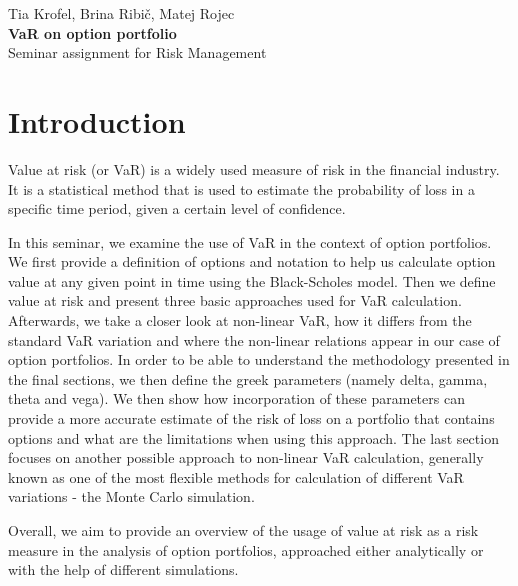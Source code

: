 \documentclass[a4paper, 12pt]{article}
\theoremstyle{definition}
\theoremstyle{plain}
\theoremstyle{definition}
\newcommand{\imeavtorja}{Tia Krofel, Brina Ribič, Matej Rojec}
\newcommand{\naslovdela}{VaR on option portfolio}
\newcommand{\letnica}{2022}
\begin{document}
\thispagestyle{empty}
\noindent{\large
University of Ljubljana\\[1mm]
School of Economics and Business\\[5mm]
}
\vfill

\begin{center}{\large
\imeavtorja\\[2mm]
{\bf \naslovdela}\\[10mm]
Seminar assignment for Risk Management\\[1cm]}
\end{center}
\vfill

\noindent{\large
Ljubljana, \letnica}
\pagebreak

\thispagestyle{empty}
\tableofcontents
\listoffigures
\pagebreak

\section{Introduction}

Value at risk (or VaR) is a widely used measure of risk 
in the financial industry.
It is a statistical method that is used to estimate the probability 
of loss in a specific time period, given a certain level of confidence.

In this seminar, we examine the use of VaR in the context of 
option portfolios. We first provide a definition of options and 
notation to help us calculate option value at any given point in time
using the Black-Scholes model. Then we define value at risk and present 
three basic approaches used for VaR calculation. 
Afterwards, we take a closer look at non-linear VaR, how it differs from 
the standard VaR variation and where the non-linear relations appear in 
our case of option portfolios. In order to be able to understand the methodology 
presented in the final sections, we then define the greek parameters (namely 
delta, gamma, theta and vega).
We then show how incorporation of these parameters can provide a more accurate 
estimate of the risk of loss on a portfolio that contains options and 
what are the limitations when using this approach. 
The last section focuses on another possible approach to non-linear VaR calculation, 
generally known as one of the most flexible methods for calculation of different 
VaR variations - the Monte Carlo simulation. 

Overall, we aim to provide an overview of the usage of value at risk 
as a risk measure in the analysis 
of option portfolios, approached either analytically or with the help of 
different simulations.
\end{document}
